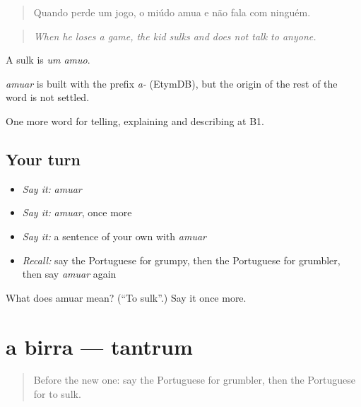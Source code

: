 \begin{quote}
Quando perde um jogo, o miúdo amua e não fala com ninguém.
\end{quote}

\begin{quote}
\emph{When he loses a game, the kid sulks and does not talk to anyone.}
\end{quote}

A sulk is \emph{um amuo}.

\begin{cousinweb}
\emph{amuar} is built with the prefix \emph{a-} (EtymDB), but the origin of the rest of the word is not settled.
\end{cousinweb}

\begin{grammarlens}[title={What you've built}]
One more word for telling, explaining and describing at B1.
\end{grammarlens}

\subsection*{Your turn}
\begin{itemize}
\raggedright
  \item \emph{Say it:} \emph{amuar}
  \item \emph{Say it:} \emph{amuar}, once more
  \item \emph{Say it:} a sentence of your own with \emph{amuar}
  \item \emph{Recall:} say the Portuguese for grumpy, then the Portuguese for grumbler, then say \emph{amuar} again
\end{itemize}

\begin{tcolorbox}[breakable,colback=teal!4,colframe=teal!35!black,title={Before you move on}]
What does amuar mean? (\textquotedblleft{}To sulk\textquotedblright{}.) Say it once more.
\end{tcolorbox}
\section[a birra]{a birra — tantrum}

\label{lesson:PT-C474-birra}



\begin{quote}
Before the new one: say the Portuguese for grumbler, then the Portuguese for to sulk.
\end{quote}


